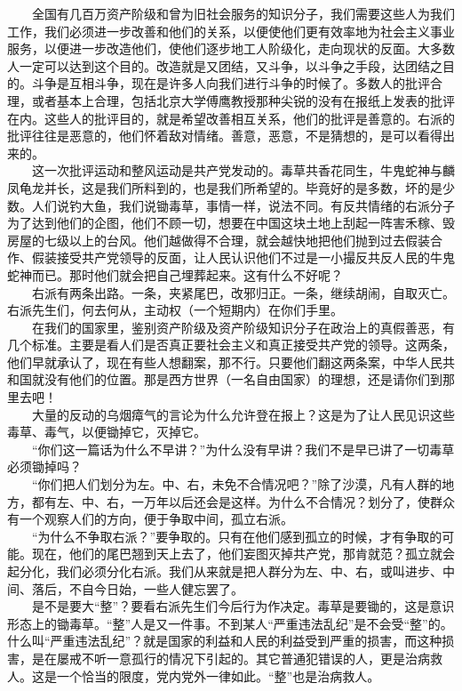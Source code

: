 \documentclass[cn,11pt,chinese]{elegantbook}
\begin{document}
　　全国有几百万资产阶级和曾为旧社会服务的知识分子，我们需要这些人为我们工作，我们必须进一步改善和他们的关系，以便使他们更有效率地为社会主义事业服务，以便进一步改造他们，使他们逐步地工人阶级化，走向现状的反面。大多数人一定可以达到这个目的。改造就是又团结，又斗争，以斗争之手段，达团结之目的。斗争是互相斗争，现在是许多人向我们进行斗争的时候了。多数人的批评合理，或者基本上合理，包括北京大学傅鹰教授那种尖锐的没有在报纸上发表的批评在内。这些人的批评目的，就是希望改善相互关系，他们的批评是善意的。右派的批评往往是恶意的，他们怀着敌对情绪。善意，恶意，不是猜想的，是可以看得出来的。\\
　　这一次批评运动和整风运动是共产党发动的。毒草共香花同生，牛鬼蛇神与麟凤龟龙并长，这是我们所料到的，也是我们所希望的。毕竟好的是多数，坏的是少数。人们说钓大鱼，我们说锄毒草，事情一样，说法不同。有反共情绪的右派分子为了达到他们的企图，他们不顾一切，想要在中国这块土地上刮起一阵害禾稼、毁房屋的七级以上的台风。他们越做得不合理，就会越快地把他们抛到过去假装合作、假装接受共产党领导的反面，让人民认识他们不过是一小撮反共反人民的牛鬼蛇神而已。那时他们就会把自己埋葬起来。这有什么不好呢？\\
　　右派有两条出路。一条，夹紧尾巴，改邪归正。一条，继续胡闹，自取灭亡。右派先生们，何去何从，主动权（一个短期内）在你们手里。\\
　　在我们的国家里，鉴别资产阶级及资产阶级知识分子在政治上的真假善恶，有几个标准。主要是看人们是否真正要社会主义和真正接受共产党的领导。这两条，他们早就承认了，现在有些人想翻案，那不行。只要他们翻这两条案，中华人民共和国就没有他们的位置。那是西方世界（一名自由国家）的理想，还是请你们到那里去吧！\\
　　大量的反动的乌烟瘴气的言论为什么允许登在报上？这是为了让人民见识这些毒草、毒气，以便锄掉它，灭掉它。\\
　　“你们这一篇话为什么不早讲？”为什么没有早讲？我们不是早已讲了一切毒草必须锄掉吗？\\
　　“你们把人们划分为左。中、右，未免不合情况吧？”除了沙漠，凡有人群的地方，都有左、中、右，一万年以后还会是这样。为什么不合情况？划分了，使群众有一个观察人们的方向，便于争取中间，孤立右派。\\
　　“为什么不争取右派？”要争取的。只有在他们感到孤立的时候，才有争取的可能。现在，他们的尾巴翘到天上去了，他们妄图灭掉共产党，那肯就范？孤立就会起分化，我们必须分化右派。我们从来就是把人群分为左、中、右，或叫进步、中间、落后，不自今日始，一些人健忘罢了。\\
　　是不是要大“整”？要看右派先生们今后行为作决定。毒草是要锄的，这是意识形态上的锄毒草。“整”人是又一件事。不到某人“严重违法乱纪”是不会受“整”的。什么叫“严重违法乱纪”？就是国家的利益和人民的利益受到严重的损害，而这种损害，是在屡戒不听一意孤行的情况下引起的。其它普通犯错误的人，更是治病救人。这是一个恰当的限度，党内党外一律如此。“整”也是治病救人。\\
\end{document}
